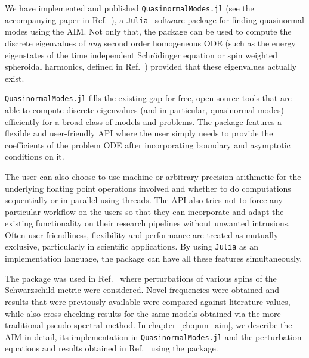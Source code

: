 We have implemented and published \texttt{QuasinormalModes.jl} (see the accompanying paper in Ref.~\cite{Sanches2022}), a \texttt{Julia}~\cite{Bezanson2017} software package for finding quasinormal modes using the \ac{AIM}. Not only that, the package can be used to compute the discrete eigenvalues of \emph{any} second order homogeneous \ac{ODE} (such as the energy eigenstates of the time independent Schrödinger equation or spin weighted spheroidal harmonics, defined in Ref.~\cite{PhysRevD.73.024013}) provided that these eigenvalues actually exist.

\texttt{QuasinormalModes.jl} fills the existing gap for free, open source tools that are able to compute discrete eigenvalues (and in particular, quasinormal modes) efficiently for a broad class of models and problems. The package features a flexible and user-friendly \ac{API} where the user simply needs to provide the coefficients of the problem \ac{ODE} after incorporating boundary and asymptotic conditions on it.

The user can also choose to use machine or arbitrary precision arithmetic for the underlying floating point operations involved and whether to do computations sequentially or in parallel using threads. The \ac{API} also tries not to force any particular workflow on the users so that they can incorporate and adapt the existing functionality on their research pipelines without unwanted intrusions.
Often user-friendliness, flexibility and performance are treated as mutually exclusive, particularly in scientific applications. By using \texttt{Julia} as an implementation language, the package can have all these features simultaneously.

The package was used in Ref.~\cite{Mamani2022} where perturbations of various spins of the Schwarzschild metric were considered. Novel frequencies were obtained and results that were previously available were compared against literature values, while also cross-checking results for the same models obtained via the more traditional pseudo-spectral method.
In chapter~\ref{ch:qnm_aim}, we describe the \ac{AIM} in detail, its implementation in \texttt{QuasinormalModes.jl} and the perturbation equations and results obtained in Ref.~\cite{Mamani2022} using the package.